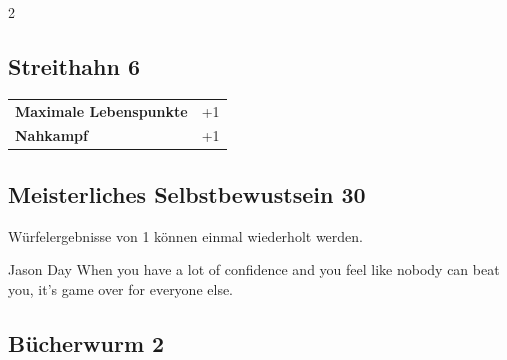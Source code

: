 \begin{multicols}{2}
\begin{tcolorbox}

\end{tcolorbox}

\begin{tcolorbox}
    \subsection*{Streithahn \hfill \small{6 }}
    \tcblower




\begin{tabular}{@{}ll@{}}
    \textbf{Maximale Lebenspunkte} & +1\\
    \textbf{Nahkampf} & +1\\
\end{tabular}


\end{tcolorbox}

\begin{tcolorbox}
    \subsection*{Meisterliches Selbstbewustsein \hfill \small{30 }}
    \tcblower
Würfelergebnisse von 1 können einmal wiederholt werden.

\begin{pquote}{Jason Day}
When you have a lot of confidence and you feel like nobody can beat you, it’s game over for everyone else.
\end{pquote}

\vspace{3mm}



\end{tcolorbox}

\begin{tcolorbox}
    \subsection*{Bücherwurm \hfill \small{2 }}
    \tcblower





\end{tcolorbox}
\end{multicols}

